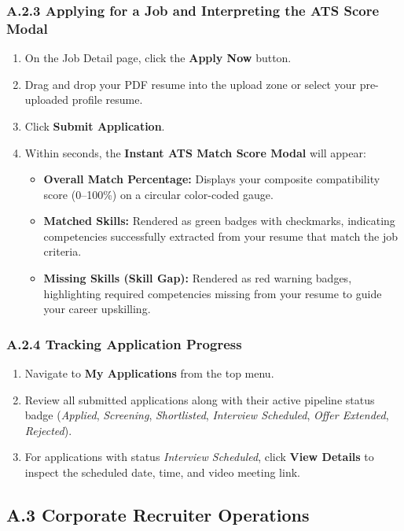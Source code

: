 \subsubsection{A.2.3 Applying for a Job and Interpreting the ATS Score Modal}
\begin{enumerate}
    \item On the Job Detail page, click the \textbf{Apply Now} button.
    \item Drag and drop your PDF resume into the upload zone or select your pre-uploaded profile resume.
    \item Click \textbf{Submit Application}.
    \item Within seconds, the \textbf{Instant ATS Match Score Modal} will appear:
    \begin{itemize}
        \item \textbf{Overall Match Percentage:} Displays your composite compatibility score (0--100\%) on a circular color-coded gauge.
        \item \textbf{Matched Skills:} Rendered as green badges with checkmarks, indicating competencies successfully extracted from your resume that match the job criteria.
        \item \textbf{Missing Skills (Skill Gap):} Rendered as red warning badges, highlighting required competencies missing from your resume to guide your career upskilling.
    \end{itemize}
\end{enumerate}

\subsubsection{A.2.4 Tracking Application Progress}
\begin{enumerate}
    \item Navigate to \textbf{My Applications} from the top menu.
    \item Review all submitted applications along with their active pipeline status badge (\textit{Applied}, \textit{Screening}, \textit{Shortlisted}, \textit{Interview Scheduled}, \textit{Offer Extended}, \textit{Rejected}).
    \item For applications with status \textit{Interview Scheduled}, click \textbf{View Details} to inspect the scheduled date, time, and video meeting link.
\end{enumerate}

\subsection{A.3 Corporate Recruiter Operations}

